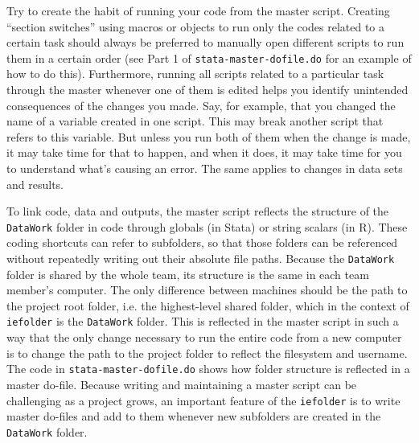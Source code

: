 Try to create the habit of running your code from the master script.
Creating ``section switches'' using macros or objects to run only the codes related to a certain task
should always be preferred to manually open different scripts to run them in a certain order
(see Part 1 of \texttt{stata-master-dofile.do} for an example of how to do this).
Furthermore, running all scripts related to a particular task through the master whenever one of them is edited
helps you identify unintended consequences of the changes you made.
Say, for example, that you changed the name of a variable created in one script.
This may break another script that refers to this variable.
But unless you run both of them when the change is made, it may take time for that to happen, 
and when it does, it may take time for you to understand what's causing an error.
The same applies to changes in data sets and results.

To link code, data and outputs, the master script reflects the structure of the \texttt{DataWork} folder in code
through globals (in Stata) or string scalars (in R).
These coding shortcuts can refer to subfolders,
so that those folders can be referenced without repeatedly writing out their absolute file paths.
Because the \texttt{DataWork} folder is shared by the whole team,
its structure is the same in each team member's computer.
The only difference between machines should be
the path to the project root folder, i.e. the highest-level shared folder, which in the context of \texttt{iefolder} is the \texttt{DataWork} folder.
This is reflected in the master script in such a way that
the only change necessary to run the entire code from a new computer
is to change the path to the project folder to reflect the filesystem and username.
The code in \texttt{stata-master-dofile.do} shows how folder structure is reflected in a master do-file.
Because writing and maintaining a master script can be challenging as a project grows,
an important feature of the \texttt{iefolder} is to write master do-files
and add to them whenever new subfolders are created in the \texttt{DataWork} folder.

